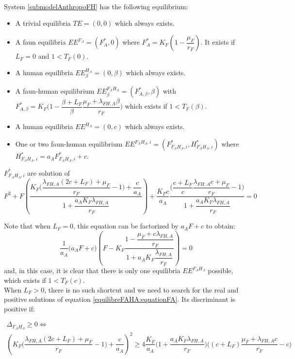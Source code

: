 \documentclass{article}
\newcommand{\lfa}{\lambda_{FH, A}}
\begin{document}
System \eqref{submodelAnthropoFH} has the following equilibrium:
\begin{itemize}
\item A trivial equilibria $TE= (0,0)$ which always exists.
\item A faun equilibria $EE^{F_A} = (F_A^*, 0)$ where $F_A^* = K_F\left(1 - \dfrac{\mu_F}{r_F}\right)$. It exists if $L_F = 0$ and $1 < T_F(0)$.
\item A human equilibria $EE^{H_A}_\beta = (0, \beta)$ which always exists.
\item A faun-human equilibrium $EE^{F_AH_A}_\beta = (F^*_{A, \beta}, \beta)$ with $F^*_{A, \beta} = K_F \Big(1-\dfrac{\beta + L_F}{\beta}\dfrac{\mu_F + \lfa \beta}{r_F}\Big)$ which exists if $1 < T_F(\beta)$.
\item A human equilibria $EE^{H_A} = (0, c)$ which always exists.
\item One or two faun-human equilibrium $EE^{F_AH_A, i} = (F^*_{F_AH_A, i}, H^*_{F_AH_A, i})$ where $H^*_{F_AH_A, i} = a_AF^*_{F_AH_A, i}+c$.
\end{itemize}
 $F^*_{F_AH_A, i}$ are solution of 
\begin{equation}
F^2 + F \left(\dfrac{K_F\Big(\dfrac{\lfa(2c+L_F) + \mu_F}{r_F} - 1\Big) + \dfrac{c}{a_A}}{1 + \dfrac{a_A K_F \lfa}{r_F}}  \right) + \dfrac{K_Fc}{a_A} \dfrac{\Big(\dfrac{c+L_F}{c} \dfrac{\lfa c + \mu_F}{r_F} - 1\Big)}{1 + \dfrac{a_A K_F \lfa}{r_F}} = 0
\label{equilibreFAHA:equationFA}
\end{equation}

Note that when $L_F = 0$, this equation can be factorized by $a_A F + c$ to obtain:
\begin{equation}
\dfrac{1}{a_A}\Big(a_A F + c\Big) \left(F - K_F \dfrac{1 - \dfrac{\mu_F + c \lfa}{r_F}}{1 + a_A K_F \dfrac{\lfa}{r_F}}\right) = 0
\label{equilibreFAHA:equationFA, LF = 0}
\end{equation}
and, in this case, it is clear that there is only one equilibria $EE^{F_AH_A}$ possible, which exists if $1 < T_F(c)$.
\\

When $L_F > 0$, there is no such shortcut and we need to search for the real and positive solutions of equation \eqref{equilibreFAHA:equationFA}. Its discriminant is positive if:

\begin{multline}
\Delta_{F_AH_A} \geq 0 \Leftrightarrow \\
\left(K_F \Big(\dfrac{\lfa(2c+L_F) + \mu_F}{r_F} - 1\Big) + \dfrac{c}{a_A} \right)^2 \geq  4 \dfrac{K_F}{a_A}  \Big(1 + \dfrac{a_A K_F \lfa}{r_F}\Big) \Big((c+L_F) \dfrac{\mu_F + \lfa c}{r_F} - c\Big)
\label{equilibreFAHA:discriminant}
\end{multline}
\end{document}
